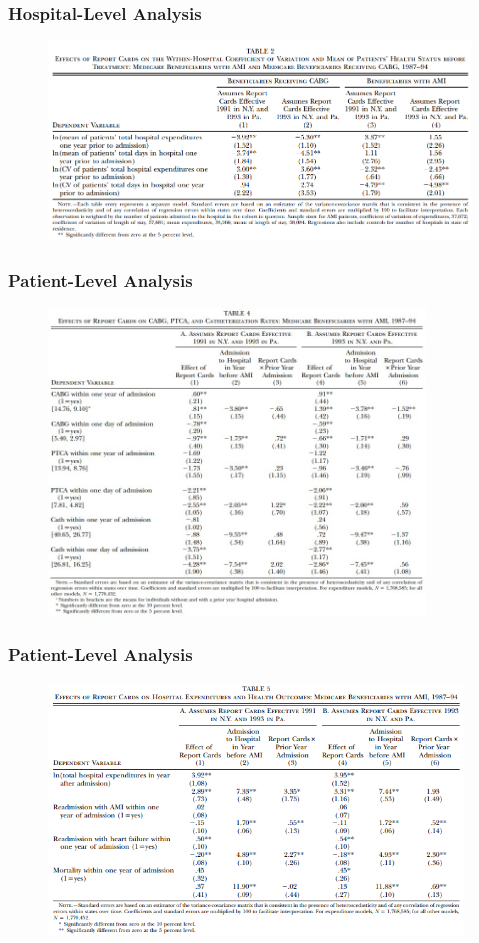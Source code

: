 \documentclass[10pt]{beamer}
\begin{document}
\begin{frame}\frametitle{Hospital-Level Analysis}
\setlength{\leftmargini}{12pt}
\vspace{-7.5mm}
 \begin{figure}[h!]
        \centering
        \includegraphics[width=112mm]{table1.png}
        \label{fig:method}
        \end{figure}
        \vspace{-9.5mm}

\end{frame}

\begin{frame}\frametitle{Patient-Level Analysis}
 \begin{figure}[h!]
        \centering
        \includegraphics[width=100mm]{table2.jpg}
        \label{fig:method}
        \end{figure}
\end{frame}

\begin{frame}\frametitle{Patient-Level Analysis}
 \begin{figure}[h!]
        \centering
        \includegraphics[width=110mm]{table3.png}
        \label{fig:method}
        \end{figure}
\end{frame}
\end{document}
